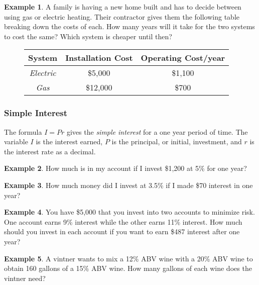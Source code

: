 \documentclass[addpoints,12pt]{exam}
\theoremstyle{definition}
\theoremstyle{break}
\theoremstyle{break}
\newtheorem{example}{Example}[subsection]
\begin{document}
\newpage

\begin{example}
A family is having a new home built and has to decide between using gas or electric heating. Their contractor gives them the following table breaking down the costs of each. How many years will it take for the two systems to cost the same? Which system is cheaper until then?

\begin{figure}[h]
\centering
\begin{tabular}{c | c | c}
\textbf{System} & \textbf{Installation Cost} & \textbf{Operating Cost/year} \\\hline
\emph{Electric} & \$5,000 & \$1,100\\\hline
\emph{Gas} & \$12,000 & \$700\\\hline
\end{tabular}
\end{figure}

\end{example}

\newpage

\subsubsection*{Simple Interest}

The formula $I = Pr$ gives the \emph{simple interest} for a one year period of time. The variable $I$ is the interest earned, $P$ is the principal, or initial, investment, and $r$ is the interest rate as a decimal.

\vspace{.15in}

\begin{example}
How much is in my account if I invest \$1,200 at 5\% for one year?
\vspace{2.5in}
\end{example}

\begin{example}
How much money did I invest at 3.5\% if I made \$70 interest in one year?
\end{example}

\newpage

\begin{example}
You have \$5,000 that you invest into two accounts to minimize risk. One account earns 9\% interest while the other earns 11\% interest. How much should you invest in each account if you want to earn \$487 interest after one year?
\end{example}

\newpage

\begin{example}
A vintner wants to mix a 12\% ABV wine with a 20\% ABV wine to obtain 160 gallons of a 15\% ABV wine. How many gallons of each wine does the vintner need?
\end{example}
\end{document}
